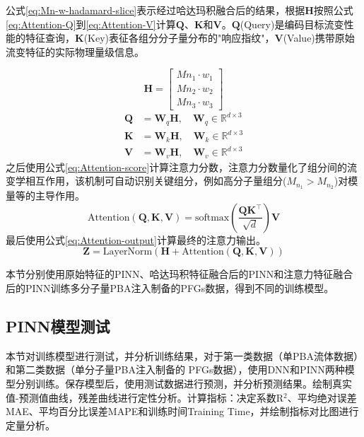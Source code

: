 公式\eqref{eq:Mn-w-hadamard-slice}表示经过哈达玛积融合后的结果，根据$\mathbf{H}$按照公式\eqref{eq:Attention-Q}到\eqref{eq:Attention-V}计算$\mathbf{Q}$、$\mathbf{K}$和$\mathbf{V}$。$\mathbf{Q}$(Query)是编码目标流变性能的特征查询，$\mathbf{K}$(Key)表征各组分分子量分布的"响应指纹"，$\mathbf{V}$(Value)携带原始流变特征的实际物理量级信息。

\begin{equation}
  \mathbf{H} =
  \begin{bmatrix}
    Mn_{1} \cdot w_1 \\
    Mn_{2} \cdot w_2 \\
    Mn_{3} \cdot w_3
  \end{bmatrix} \label{eq:Mn-w-hadamard-slice}
\end{equation}
\begin{align}
  \mathbf{Q} & = \mathbf{W}_q \mathbf{H}, \quad \mathbf{W}_q \in \mathbb{R}^{d \times 3}  \label{eq:Attention-Q} \\
  \mathbf{K} & = \mathbf{W}_k \mathbf{H}, \quad \mathbf{W}_k \in \mathbb{R}^{d \times 3} \label{eq:Attention-K}  \\
  \mathbf{V} & = \mathbf{W}_v \mathbf{H}, \quad \mathbf{W}_v \in \mathbb{R}^{d \times 3} \label{eq:Attention-V}
\end{align}
之后使用公式\eqref{eq:Attention-score}计算注意力分数，注意力分数量化了组分间的流变学相互作用，该机制可自动识别关键组分，例如高分子量组分($M_{n_1} > M_{n_2}$)对模量等的主导作用。
\begin{equation}
  \text{Attention}(\mathbf{Q}, \mathbf{K}, \mathbf{V}) = \text{softmax}\left(\frac{\mathbf{Q} \mathbf{K}^\top}{\sqrt{d}}\right) \mathbf{V} \label{eq:Attention-score}
\end{equation}
最后使用公式\eqref{eq:Attention-output}计算最终的注意力输出。
\begin{equation}
  \mathbf{Z} = \text{LayerNorm}(\mathbf{H} + \text{Attention}(\mathbf{Q}, \mathbf{K}, \mathbf{V}))
  \label{eq:Attention-output}
\end{equation}

本节分别使用原始特征的PINN、哈达玛积特征融合后的PINN和注意力特征融合后的PINN训练多分子量PBA注入制备的PFGs数据，得到不同的训练模型。

\subsection{PINN模型测试}
本节对训练模型进行测试，并分析训练结果，对于第一类数据（单PBA流体数据）和第二类数据（单分子量PBA注入制备的 PFGs数据），使用DNN和PINN两种模型分别训练。保存模型后，使用测试数据进行预测，并分析预测结果。绘制真实值-预测值曲线，残差曲线进行定性分析。计算指标：决定系数R$^2$、平均绝对误差MAE、平均百分比误差MAPE和训练时间Training Time，并绘制指标对比图进行定量分析。

